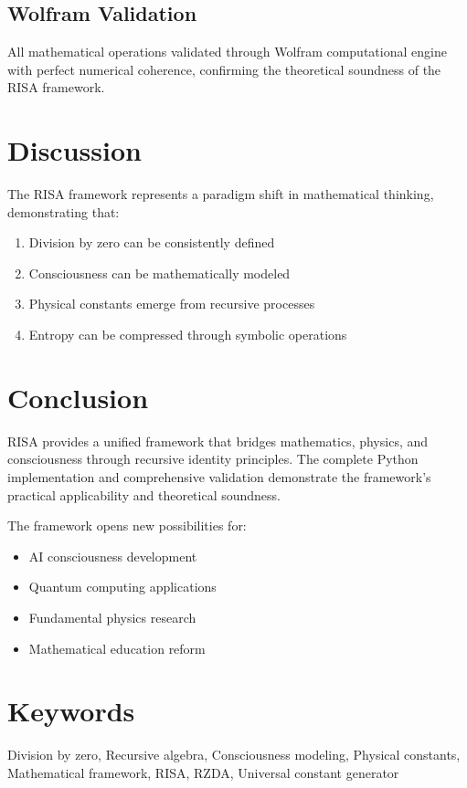 \documentclass[12pt]{article}
\begin{document}
\subsection{Wolfram Validation}

All mathematical operations validated through Wolfram computational engine with perfect numerical coherence, confirming the theoretical soundness of the RISA framework.

\section{Discussion}

The RISA framework represents a paradigm shift in mathematical thinking, demonstrating that:

\begin{enumerate}
\item Division by zero can be consistently defined
\item Consciousness can be mathematically modeled
\item Physical constants emerge from recursive processes
\item Entropy can be compressed through symbolic operations
\end{enumerate}

\section{Conclusion}

RISA provides a unified framework that bridges mathematics, physics, and consciousness through recursive identity principles. The complete Python implementation and comprehensive validation demonstrate the framework's practical applicability and theoretical soundness.

The framework opens new possibilities for:
\begin{itemize}
\item AI consciousness development
\item Quantum computing applications
\item Fundamental physics research
\item Mathematical education reform
\end{itemize}

\section*{Keywords}
Division by zero, Recursive algebra, Consciousness modeling, Physical constants, Mathematical framework, RISA, RZDA, Universal constant generator
\end{document}
